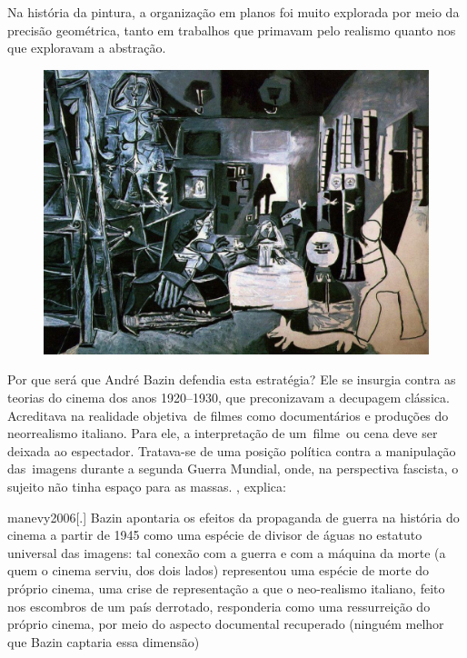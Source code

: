 Na história da pintura, a organização em planos foi muito explorada por
meio da precisão geométrica, tanto em trabalhos que primavam pelo
realismo quanto nos que exploravam a abstração.

\begin{figure}
  \flushright
  \begin{minipage}{.6\linewidth}
	\caption{}
	\includegraphics[width=\linewidth]{figuras/picasso-las-meninas-1957.pdf.compressed.pdf}
  \end{minipage}
\end{figure}

Por que será que André Bazin defendia esta estratégia? Ele se insurgia
contra as teorias do cinema dos anos 1920--1930, que preconizavam a decupagem
clássica. Acreditava na realidade objetiva~de filmes como documentários
e produções do neorrealismo italiano. Para ele, a interpretação de 
um~filme~ou cena deve ser deixada ao espectador. Tratava-se de uma posição
política contra a manipulação das\pagebreak\ imagens durante a segunda Guerra
Mundial, onde, na perspectiva fascista, o sujeito não tinha espaço para
as massas. \textcite{manevy2006}, explica:

\begin{displaycquote}[233]{manevy2006}[.]
	Bazin apontaria os efeitos da propaganda de guerra na história do cinema
	a partir de 1945 como uma espécie de divisor de águas no estatuto
	universal das imagens: tal conexão com a guerra e com a máquina da morte
	(a quem o cinema serviu, dos dois lados) representou uma espécie de
	morte do próprio cinema, uma crise de representação a que o neo-realismo
	italiano, feito nos escombros de um país derrotado, responderia como uma
	ressurreição do próprio cinema, por meio do aspecto documental
	recuperado (ninguém melhor que Bazin captaria essa dimensão)
\end{displaycquote}

